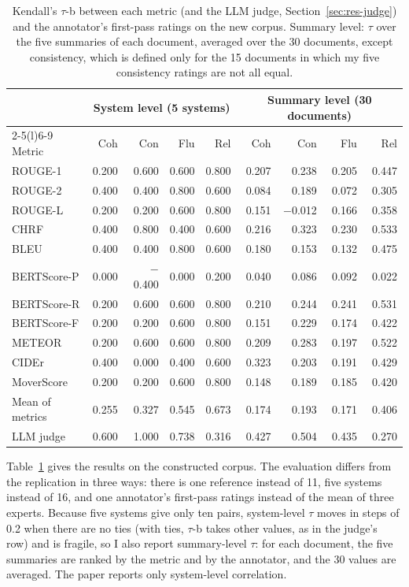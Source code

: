 \documentclass[11pt]{article}
\begin{document}
\begin{table}[t]
\centering
\small
\begin{tabular}{@{}l rrrr rrrr@{}}
\toprule
& \multicolumn{4}{c}{System level (5 systems)} & \multicolumn{4}{c}{Summary level (30 documents)} \\
\cmidrule(lr){2-5}\cmidrule(l){6-9}
Metric & Coh & Con & Flu & Rel & Coh & Con & Flu & Rel \\
\midrule
ROUGE-1 & 0.200 & 0.600 & 0.600 & 0.800 & 0.207 & 0.238 & 0.205 & 0.447 \\
ROUGE-2 & 0.400 & 0.400 & 0.800 & 0.600 & 0.084 & 0.189 & 0.072 & 0.305 \\
ROUGE-L & 0.200 & 0.200 & 0.600 & 0.800 & 0.151 & $-$0.012 & 0.166 & 0.358 \\
CHRF & 0.400 & 0.800 & 0.400 & 0.600 & 0.216 & 0.323 & 0.230 & 0.533 \\
BLEU & 0.400 & 0.400 & 0.800 & 0.600 & 0.180 & 0.153 & 0.132 & 0.475 \\
BERTScore-P & 0.000 & $-$0.400 & 0.000 & 0.200 & 0.040 & 0.086 & 0.092 & 0.022 \\
BERTScore-R & 0.200 & 0.600 & 0.600 & 0.800 & 0.210 & 0.244 & 0.241 & 0.531 \\
BERTScore-F & 0.200 & 0.200 & 0.600 & 0.800 & 0.151 & 0.229 & 0.174 & 0.422 \\
METEOR & 0.200 & 0.600 & 0.600 & 0.800 & 0.209 & 0.283 & 0.197 & 0.522 \\
CIDEr & 0.400 & 0.000 & 0.400 & 0.600 & 0.323 & 0.203 & 0.191 & 0.429 \\
MoverScore & 0.200 & 0.200 & 0.600 & 0.800 & 0.148 & 0.189 & 0.185 & 0.420 \\
\midrule
Mean of metrics & 0.255 & 0.327 & 0.545 & 0.673 & 0.174 & 0.193 & 0.171 & 0.406 \\
\midrule
LLM judge & 0.600 & 1.000 & 0.738 & 0.316 & 0.427 & 0.504 & 0.435 & 0.270 \\
\bottomrule
\end{tabular}
\caption{Kendall's $\tau$-b between each metric (and the LLM judge, Section~\ref{sec:res-judge}) and the annotator's first-pass ratings on the new corpus. Summary level: $\tau$ over the five summaries of each document, averaged over the 30 documents, except consistency, which is defined only for the 15 documents in which my five consistency ratings are not all equal.}
\label{tab:corpus}
\end{table}

Table~\ref{tab:corpus} gives the results on the constructed corpus. The evaluation differs from the replication in three ways: there is one reference instead of 11, five systems instead of 16, and one annotator's first-pass ratings instead of the mean of three experts. Because five systems give only ten pairs, system-level $\tau$ moves in steps of 0.2 when there are no ties (with ties, $\tau$-b takes other values, as in the judge's row) and is fragile, so I also report summary-level $\tau$: for each document, the five summaries are ranked by the metric and by the annotator, and the 30 values are averaged. The paper reports only system-level correlation.
\end{document}
